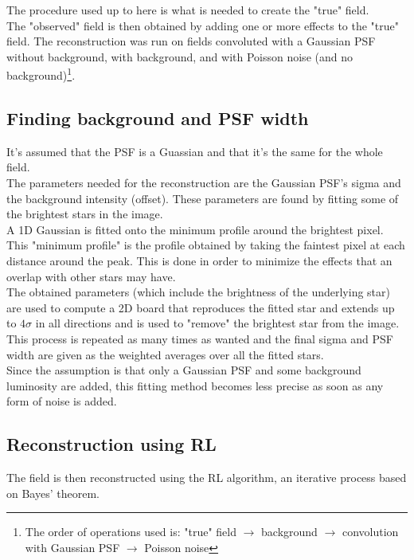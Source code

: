 \documentclass[a4paper]{article}
\begin{document}
\begin{multicols}{2}
			The procedure used up to here is what is needed to create the "true" field.\\
			
			The "observed" field is then obtained by adding one or more effects to the "true" field. The reconstruction was run on fields convoluted with a Gaussian PSF without background, with background, and with Poisson noise (and no background)\footnote{The order of operations used is: "true" field $\rightarrow$ background $\rightarrow$ convolution with Gaussian PSF $\rightarrow$ Poisson noise}.\\
			
		\subsection{Finding background and PSF width}
			It's assumed that the PSF is a Guassian and that it's the same for the whole field.\\
			
			The parameters needed for the reconstruction are the Gaussian PSF's sigma and the background intensity (offset). These parameters are found by fitting some of the brightest stars in the image.\\
			A 1D Gaussian is fitted onto the minimum profile around the brightest pixel. This "minimum profile" is the profile obtained by taking the faintest pixel at each distance around the peak. This is done in order to minimize the effects that an overlap with other stars may have.\\
			The obtained parameters (which include the brightness of the underlying star) are used to compute a 2D board that reproduces the fitted star and extends up to $4\sigma$ in all directions and is used to "remove" the brightest star from the image.\\
			This process is repeated as many times as wanted and the final sigma and PSF width are given as the weighted averages over all the fitted stars.\\
			
			Since the assumption is that only a Gaussian PSF and some background luminosity are added, this fitting method becomes less precise as soon as any form of noise is added.\\
			
		\subsection{Reconstruction using RL}
			The field is then reconstructed using the RL algorithm, an iterative process based on Bayes' theorem.\\
			

\end{multicols}
\end{document}
